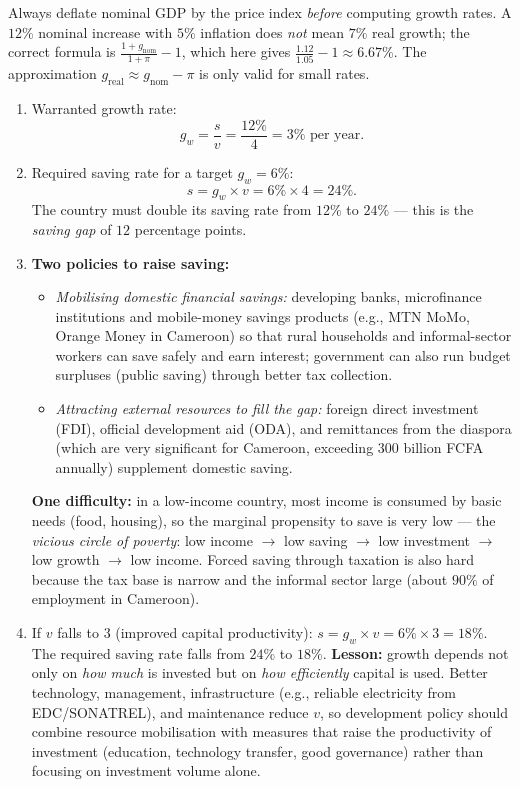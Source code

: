\documentclass[11pt]{article}
\begin{document}
\begin{attention}
Always deflate nominal GDP by the price index \emph{before} computing growth rates. A $12\%$ nominal increase with $5\%$ inflation does \emph{not} mean $7\%$ real growth; the correct formula is $\frac{1+g_{\text{nom}}}{1+\pi}-1$, which here gives $\frac{1.12}{1.05}-1 \approx 6.67\%$. The approximation $g_{\text{real}} \approx g_{\text{nom}} - \pi$ is only valid for small rates.
\end{attention}

\begin{corrige}
\begin{enumerate}
\item Warranted growth rate:
\[ g_w = \dfrac{s}{v} = \dfrac{12\%}{4} = 3\% \text{ per year.} \]
\item Required saving rate for a target $g_w = 6\%$:
\[ s = g_w \times v = 6\% \times 4 = 24\%. \]
The country must double its saving rate from $12\%$ to $24\%$ — this is the \emph{saving gap} of $12$ percentage points.
\item \textbf{Two policies to raise saving:}
\begin{itemize}
\item \emph{Mobilising domestic financial savings:} developing banks, microfinance institutions and mobile-money savings products (e.g., MTN MoMo, Orange Money in Cameroon) so that rural households and informal-sector workers can save safely and earn interest; government can also run budget surpluses (public saving) through better tax collection.
\item \emph{Attracting external resources to fill the gap:} foreign direct investment (FDI), official development aid (ODA), and remittances from the diaspora (which are very significant for Cameroon, exceeding $300$ billion FCFA annually) supplement domestic saving.
\end{itemize}
\textbf{One difficulty:} in a low-income country, most income is consumed by basic needs (food, housing), so the marginal propensity to save is very low — the \emph{vicious circle of poverty}: low income $\rightarrow$ low saving $\rightarrow$ low investment $\rightarrow$ low growth $\rightarrow$ low income. Forced saving through taxation is also hard because the tax base is narrow and the informal sector large (about $90\%$ of employment in Cameroon).
\item If $v$ falls to $3$ (improved capital productivity): $s = g_w \times v = 6\% \times 3 = 18\%$. The required saving rate falls from $24\%$ to $18\%$. \textbf{Lesson:} growth depends not only on \emph{how much} is invested but on \emph{how efficiently} capital is used. Better technology, management, infrastructure (e.g., reliable electricity from EDC/SONATREL), and maintenance reduce $v$, so development policy should combine resource mobilisation with measures that raise the productivity of investment (education, technology transfer, good governance) rather than focusing on investment volume alone.
\end{enumerate}
\end{corrige}
\end{document}
